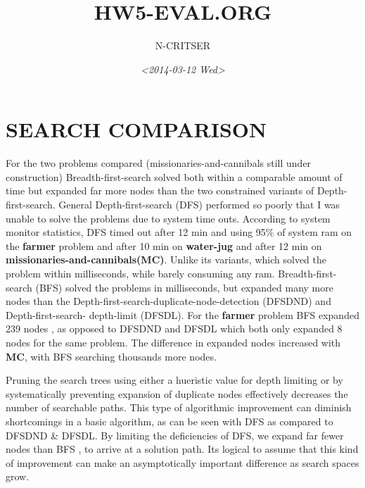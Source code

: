 \documentclass[a4paper,6pt]{article}
\author{N-CRITSER}
\date{\textit{<2014-03-12 Wed>}}
\title{HW5-EVAL.ORG}
\begin{document}
\maketitle
{}


\section{SEARCH COMPARISON}
\label{sec-1}
    For the two problems compared (missionaries-and-cannibals still under construction)
Breadth-first-search solved both within a comparable amount of time but expanded
far more nodes than the two constrained variants of Depth-first-search.  General
Depth-first-search (DFS)  performed so poorly that I was unable to solve the problems
due to system time outs.  According to system monitor statistics,   
DFS timed out after 12 min and using 95\% of system ram on the \textbf{farmer} problem and 
after 10 min on \textbf{water-jug}  and after 12 min on \textbf{missionaries-and-cannibals(MC)}.  
Unlike its  variants, which solved the problem within milliseconds, 
while barely consuming any ram. 
Breadth-first-search (BFS) solved the problems in milliseconds, but expanded many more 
nodes than the Depth-first-search-duplicate-node-detection (DFSDND) and Depth-first-search-
depth-limit (DFSDL).  For the \textbf{farmer} problem BFS expanded 239 nodes , as opposed to 
DFSDND and DFSDL which both only expanded 8 nodes for the same problem.  The difference
in expanded nodes increased with \textbf{MC}, with BFS searching thousands more nodes.    

    Pruning the search trees using either a hueristic value for depth limiting or by 
systematically preventing expansion of duplicate nodes effectively decreases the number
of searchable paths.  This type of algorithmic improvement can diminish shortcomings in a 
basic algorithm, as can be seen with DFS as compared to DFSDND \& DFSDL.  By limiting the 
deficiencies of DFS, we expand far fewer nodes than BFS , to arrive at a solution path. Its
logical to assume that this kind of improvement can make an asymptotically important difference
as search spaces grow.  
\end{document}
